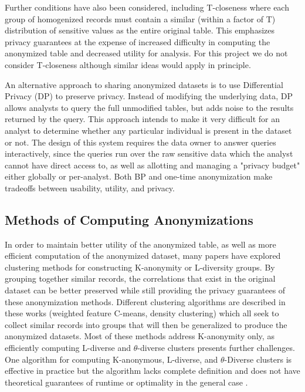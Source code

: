 Further conditions have also been considered, including T-closeness\cite{litCloseness} where each group of homogenized records must contain a similar (within a factor of T) distribution of sensitive values as the entire original table. This emphasizes privacy guarantees at the expense of increased difficulty in computing the anonymized table and decreased utility for analysis. For this project we do not consider T-closeness although similar ideas would apply in principle.

An alternative approach to sharing anonymized datasets is to use Differential Privacy\cite{dworkDifferential} (DP) to preserve privacy. Instead of modifying the underlying data, DP allows analysts to query the full unmodified tables, but adds noise to the results returned by the query. This approach intends to make it very difficult for an analyst to determine whether any particular individual is present in the dataset or not. The design of this system requires the data owner to answer queries interactively, since the queries run over the raw sensitive data which the analyst cannot have direct access to, as well as allotting and managing a "privacy budget" either globally or per-analyst. Both BP and one-time anonymization make tradeoffs between usability, utility, and privacy.

\subsection{Methods of Computing Anonymizations}
In order to maintain better utility of the anonymized table, as well as more efficient computation of the anonymized dataset, many papers have explored clustering methods for constructing K-anonymity or L-diversity groups. By grouping together similar records, the correlations that exist in the original dataset can be better preserved while still providing the privacy guarantees of these anonymization methods\cite{niClustering}\cite{liuDensity}\cite{chiuClustering}. Different clustering algorithms are described in these works (weighted feature C-means, density clustering) which all seek to collect similar records into groups that will then be generalized to produce the anonymized datasets. Most of these methods address K-anonymity only, as efficiently computing L-diverse and $\theta$-diverse clusters presents further challenges. One algorithm for computing K-anonymous, L-diverse, and $\theta$-Diverse clusters is effective in practice but the algorithm lacks complete definition and does not have theoretical guarantees of runtime or optimality in the general case \cite{yangEnhanced}.

